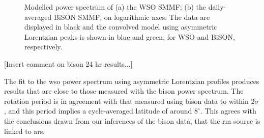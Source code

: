 
\begin{figure}[ht!]
	\centering
	\qquad
	\caption{Modelled power spectrum of (a) the WSO SMMF; (b) the daily-averaged BiSON SMMF, on logarithmic axes. The data are displayed in black and the convolved model using asymmetric Lorentzian peaks is shown in blue and green, for WSO and BiSON, respectively.} 
	\label{fig:WSO_and_24h_BiSON_PSD_fit}
\end{figure}

[Insert comment on bison 24 hr results...]

The fit to the \gls{wso} power spectrum using asymmetric Lorentzian profiles produces results that are close to those measured with the \gls{bison} power spectrum. The rotation period is in agreement with that measured using \gls{bison} data to within 2$\sigma$, and this period implies a cycle-averaged latitude of around $8^{\circ}$. This agrees with the conclusions drawn from our inferences of the \gls{bison} data, that the \gls{rm} source is linked to \glspl{ar}.

